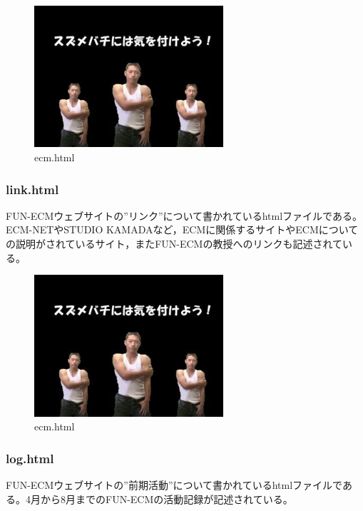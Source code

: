 \documentclass[openany,11pt,papersize]{jsbook}
\begin{document}
\begin{figure}[H]
  \begin{center} %
    \includegraphics[clip, width=7.0cm]{./figure/smile.png}
    \caption{ecm.html} %
    \label{ecm} %
  \end{center}
\end{figure}

\subsubsection{link.html}
FUN-ECMウェブサイトの”リンク”について書かれているhtmlファイルである。ECM-NETやSTUDIO KAMADAなど，ECMに関係するサイトやECMについての説明がされているサイト，またFUN-ECMの教授へのリンクも記述されている。

\begin{figure}[H]
  \begin{center} %
    \includegraphics[clip, width=7.0cm]{./figure/smile.png}
    \caption{ecm.html} %
    \label{ecm} %
  \end{center}
\end{figure}

\subsubsection{log.html}
FUN-ECMウェブサイトの”前期活動”について書かれているhtmlファイルである。4月から8月までのFUN-ECMの活動記録が記述されている。
\end{document}
